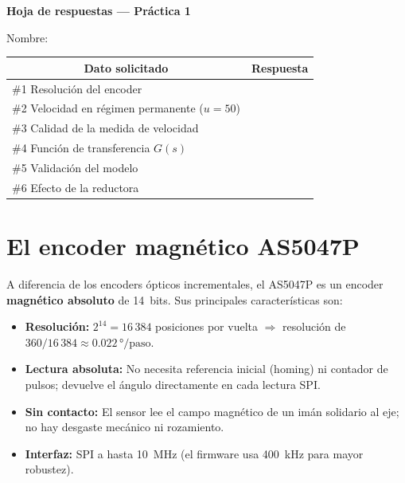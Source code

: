 \documentclass[12pt,a4paper]{article}
\begin{document}
\begin{center}
{\large\bfseries Hoja de respuestas — Práctica 1}
\end{center}

Nombre: \underline{\hspace{8cm}}

\vspace{6pt}

\begin{tabular}{|p{5.5cm}|p{8.5cm}|}
\hline
\multicolumn{1}{|c|}{\textbf{Dato solicitado}} &
\multicolumn{1}{c|}{\textbf{Respuesta}} \\
\hline
\#1 Resolución del encoder &
\vspace{2.5cm} \\
\hline
\#2 Velocidad en régimen permanente ($u=50$) &
\vspace{2.5cm} \\
\hline
\#3 Calidad de la medida de velocidad &
\vspace{2.5cm} \\
\hline
\#4 Función de transferencia $G(s)$ &
\vspace{2.5cm} \\
\hline
\#5 Validación del modelo &
\vspace{2.5cm} \\
\hline
\#6 Efecto de la reductora &
\vspace{2.5cm} \\
\hline
\end{tabular}

\appendix
\section{El encoder magnético AS5047P}

A diferencia de los encoders ópticos incrementales, el AS5047P es un encoder
\textbf{magnético absoluto} de 14~bits. Sus principales características son:

\begin{itemize}[noitemsep]
  \item \textbf{Resolución:} $2^{14} = 16\,384$ posiciones por vuelta
        $\Rightarrow$ resolución de $360/16\,384 \approx 0.022\,°/\text{paso}$.
  \item \textbf{Lectura absoluta:} No necesita referencia inicial (homing) ni
        contador de pulsos; devuelve el ángulo directamente en cada lectura SPI.
  \item \textbf{Sin contacto:} El sensor lee el campo magnético de un imán
        solidario al eje; no hay desgaste mecánico ni rozamiento.
  \item \textbf{Interfaz:} SPI a hasta 10~MHz (el firmware usa 400~kHz para
        mayor robustez).
\end{itemize}
\end{document}
